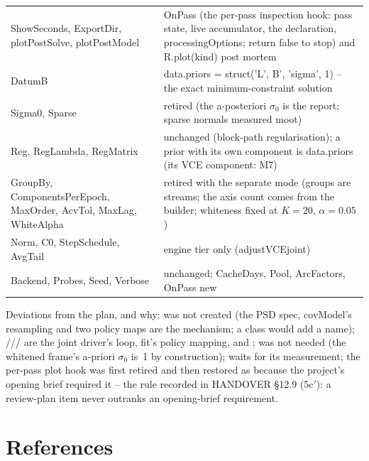 \begin{longtable}{@{}P{56mm}P{98mm}@{}}
ShowSeconds, ExportDir, plotPostSolve, plotPostModel & OnPass (the per-pass inspection hook: pass state, live accumulator, the declaration, processingOptions; return false to stop) and R.plot(kind) post mortem\\
DatumB & data.priors = struct('L', B', 'sigma', 1) -- the exact minimum-constraint solution\\
Sigma0, Sparse & retired (the a-posteriori $\sigma_0$ is the report; sparse normals measured moot)\\
Reg, RegLambda, RegMatrix & unchanged (block-path regularisation); a prior with its own component is data.priors (its VCE component: M7)\\
GroupBy, ComponentsPerEpoch, MaxOrder, AcvTol, MaxLag, WhiteAlpha & retired with the separate mode (groups are streams; the axis count comes from the builder; whiteness fixed at $K=20$, $\alpha=0.05$)\\
Norm, C0, StepSchedule, AvgTail & engine tier only (adjustVCEjoint)\\
Backend, Probes, Seed, Verbose & unchanged; CacheDays, Pool, ArcFactors, OnPass new\\
\bottomrule
\end{longtable}

Deviations from the plan, and why:  was not created (the PSD
spec, covModel's resampling and two policy maps are the mechanism; a class
would add a name); ///
are the joint driver's loop, fit's policy mapping,  and
;  was not needed (the whitened frame's
a-priori $\sigma_0$ is~1 by construction);  waits for its
measurement; the per-pass plot hook was first retired and then restored as
 because the project's opening brief required it -- the rule
recorded in HANDOVER \S12.9 (5c$'$): a review-plan item never outranks an
opening-brief requirement.

\chapter{References}

